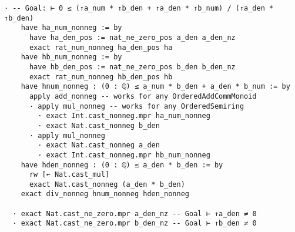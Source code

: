 \begin{example}
\begin{lstlisting}[language=lean, float=!htb]
  · -- Goal: ⊢ 0 ≤ (↑a_num * ↑b_den + ↑a_den * ↑b_num) / (↑a_den * ↑b_den)
    have ha_num_nonneg := by
      have ha_den_pos := nat_ne_zero_pos a_den a_den_nz
      exact rat_num_nonneg ha_den_pos ha
    have hb_num_nonneg := by
      have hb_den_pos := nat_ne_zero_pos b_den b_den_nz
      exact rat_num_nonneg hb_den_pos hb
    have hnum_nonneg : (0 : ℚ) ≤ a_num * b_den + a_den * b_num := by
      apply add_nonneg -- works for any OrderedAddCommMonoid
      · apply mul_nonneg -- works for any OrderedSemiring
        · exact Int.cast_nonneg.mpr ha_num_nonneg
        · exact Nat.cast_nonneg b_den
      · apply mul_nonneg
        · exact Nat.cast_nonneg a_den
        · exact Int.cast_nonneg.mpr hb_num_nonneg
    have hden_nonneg : (0 : ℚ) ≤ a_den * b_den := by
      rw [← Nat.cast_mul]
      exact Nat.cast_nonneg (a_den * b_den)
    exact div_nonneg hnum_nonneg hden_nonneg

  · exact Nat.cast_ne_zero.mpr a_den_nz -- Goal ⊢ ↑a_den ≠ 0
  · exact Nat.cast_ne_zero.mpr b_den_nz -- Goal ⊢ ↑b_den ≠ 0
\end{lstlisting}
\end{example}




